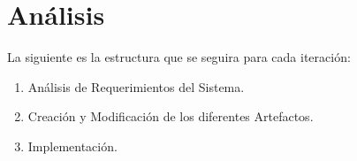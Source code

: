 \documentclass[11pt]{article}
\begin{document}
				
				
				
				
				
				
				
                \pagebreak
				
				
				
				
				
				
				
				
				
				
				
				
				
				
				
				

				
				
				
        
\section{Análisis}
La siguiente es la estructura que se seguira para cada iteración:
\begin{enumerate}
        \item Análisis de Requerimientos del Sistema.
        \item Creación y Modificación de los diferentes Artefactos.
        \item Implementación.
\end{enumerate}
\end{document}
